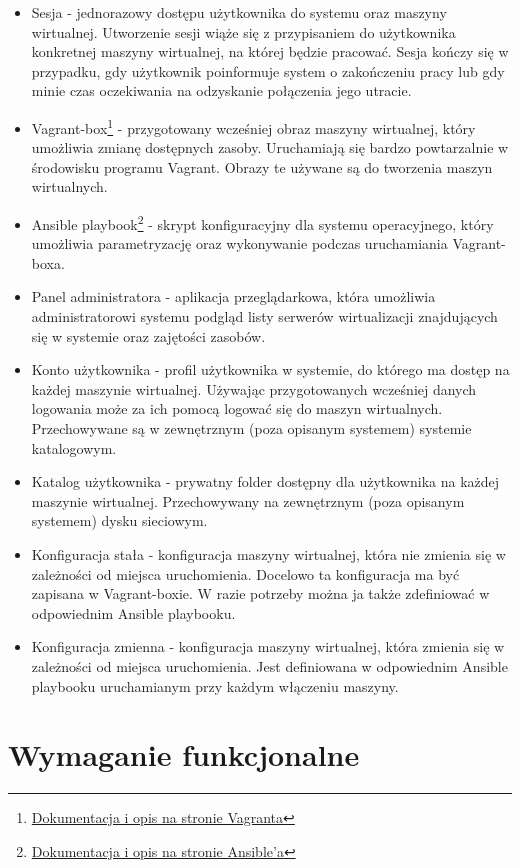 \documentclass[../praca-dyplomowa.tex]{subfiles}
\begin{document}
\begin{itemize}
    \item Sesja - jednorazowy dostępu użytkownika do systemu oraz maszyny wirtualnej. Utworzenie sesji wiąże się z przypisaniem do użytkownika konkretnej maszyny wirtualnej, na której będzie pracować. Sesja kończy się w przypadku, gdy użytkownik poinformuje system o zakończeniu pracy lub gdy minie czas oczekiwania na odzyskanie połączenia jego utracie.
    \item Vagrant-box\footnote{\href{https://www.vagrantup.com/docs/boxes}{Dokumentacja i opis na stronie Vagranta}} - przygotowany wcześniej obraz maszyny wirtualnej, który umożliwia zmianę dostępnych zasoby. Uruchamiają się bardzo powtarzalnie w środowisku programu Vagrant. Obrazy te używane są do tworzenia maszyn wirtualnych.
    \item Ansible playbook\footnote{\href{https://www.redhat.com/en/topics/automation/what-is-an-ansible-playbook\#example-of-ansible-playbook}{Dokumentacja i opis na stronie Ansible'a}} - skrypt konfiguracyjny dla systemu operacyjnego, który umożliwia parametryzację oraz wykonywanie podczas uruchamiania Vagrant-boxa.
    \item Panel administratora - aplikacja przeglądarkowa, która umożliwia administratorowi systemu podgląd listy serwerów wirtualizacji znajdujących się w systemie oraz zajętości zasobów.
    \item Konto użytkownika - profil użytkownika w systemie, do którego ma dostęp na każdej maszynie wirtualnej. Używając przygotowanych wcześniej danych logowania może za ich pomocą logować się do maszyn wirtualnych. Przechowywane są w zewnętrznym (poza opisanym systemem) systemie katalogowym.
    \item Katalog użytkownika - prywatny folder dostępny dla użytkownika na każdej maszynie wirtualnej. Przechowywany na zewnętrznym (poza opisanym systemem) dysku sieciowym.
    \item Konfiguracja stała - konfiguracja maszyny wirtualnej, która nie zmienia się w zależności od miejsca uruchomienia. Docelowo ta konfiguracja ma być zapisana w Vagrant-boxie. W razie potrzeby można ja także zdefiniować w odpowiednim Ansible playbooku.
    \item Konfiguracja zmienna - konfiguracja maszyny wirtualnej, która zmienia się w zależności od miejsca uruchomienia. Jest definiowana w odpowiednim Ansible playbooku uruchamianym przy każdym włączeniu maszyny.
\end{itemize}

\section{Wymaganie funkcjonalne}
\end{document}
